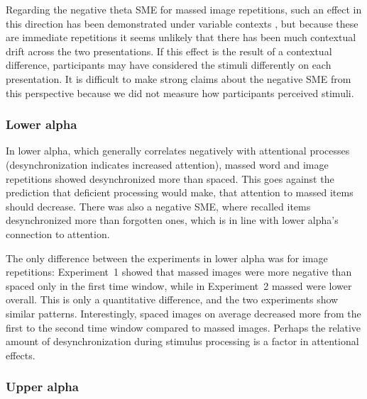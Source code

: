 

Regarding the negative theta SME for massed image repetitions, such an effect in this direction has been demonstrated under variable contexts \cite{StauHans2013}, but because these are immediate repetitions it seems unlikely that there has been much contextual drift across the two presentations.  If this effect is the result of a contextual difference, participants may have considered the stimuli differently on each presentation.  It is difficult to make strong claims about the negative SME from this perspective because we did not measure how participants perceived stimuli.

\subsubsection{Lower alpha}

In lower alpha, which generally correlates negatively with attentional processes (desynchronization indicates increased attention), massed word and image repetitions showed desynchronized more than spaced.  This goes against the prediction that deficient processing would make, that attention to massed items should decrease.  There was also a negative SME, where recalled items desynchronized more than forgotten ones, which is in line with lower alpha's connection to attention.

The only difference between the experiments in lower alpha was for image repetitions: Experiment~1 showed that massed images were more negative than spaced only in the first time window, while in Experiment~2 massed were lower overall.  This is only a quantitative difference, and the two experiments show similar patterns.  Interestingly, spaced images on average decreased more from the first to the second time window compared to massed images.  Perhaps the relative amount of desynchronization during stimulus processing is a factor in attentional effects.

\subsubsection{Upper alpha}

